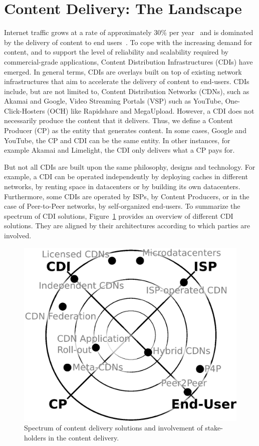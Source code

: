 \section{Content Delivery: The Landscape}\label{sec:content-delivery}

Internet traffic grows at a rate of approximately 30\% per
year~\cite{cisco-study} and is dominated by the delivery of content to end
users~\cite{IXPSIGCOMM2012,TrafficTypesGrowth:2011,arbor,PADIS2010}. To cope
with the increasing demand for content, and to support the level of reliability
and scalability required by commercial-grade applications, Content Distribution
Infrastructures (CDIs) have emerged. In general terms, CDIs are overlays built
on top of existing network infrastructures that aim to accelerate the delivery
of content to end-users. CDIs include, but are not limited to, Content
Distribution Networks (CDNs), such as Akamai and Google, Video Streaming
Portals (VSP) such as YouTube, One-Click-Hosters (OCH) like Rapidshare and
MegaUpload. However, a CDI does not necessarily produce the content that it
delivers. Thus, we define a Content Producer (CP) as the entity that generates
content. In some cases, \eg Google and YouTube, the CP and CDI can be the same
entity. In other instances, for example Akamai and Limelight, the CDI only
delivers what a CP pays for.

But not all CDIs are built upon the same philosophy, designs and technology.
For example, a CDI can be operated independently by deploying caches in
different networks, by renting space in datacenters or by building its own
datacenters. Furthermore, some CDIs are operated by ISPs, by Content Producers,
or in the case of Peer-to-Peer networks, by self-organized end-users. To
summarize the spectrum of CDI solutions, Figure~\ref{fig:cdn-spectrum} provides
an overview of different CDI solutions. They are aligned by their architectures
according to which parties are involved.

\begin{figure}[tbp]
    \begin{center}
    \includegraphics[width=0.7\linewidth]{figures/spectrum.eps}
    \end{center}
    \caption{Spectrum of content delivery solutions and involvement of stake-holders in the content delivery.}
    \label{fig:cdn-spectrum}
\end{figure}

